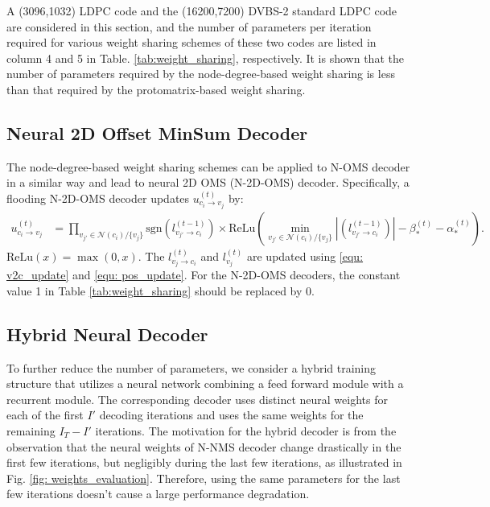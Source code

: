 \documentclass [PhD] {uclathes}
\begin{document}
A (3096,1032) LDPC code and the (16200,7200) DVBS-2\cite{noauthor_2019-nv} standard LDPC code are considered in this section, and the number of parameters per iteration required for various weight sharing schemes of these two codes are listed in column 4 and 5 in Table. \ref{tab:weight_sharing}, respectively. It is shown that the number of parameters required by the node-degree-based weight sharing is less than that required by the protomatrix-based weight sharing.

\subsection{Neural 2D Offset MinSum Decoder}
The node-degree-based weight sharing schemes can be applied to N-OMS decoder in a similar way and lead to neural 2D OMS (N-2D-OMS) decoder. Specifically, a flooding N-2D-OMS decoder updates  $u^{(t)}_{c_i\rightarrow v_j}$ by: 
\begin{align}
     u^{(t)}_{c_i\rightarrow v_j} &= \prod_{v_{j'}\in \mathcal{N}(c_i)/\{v_j\}} \text{sgn}\left(l^{(t-1)}_{v_{j'}\rightarrow c_{i}}\right)  \times   \text{ReLu} \left(\min_{v_{j'}\in \mathcal{N}(c_i)/\{v_j\}} \left|(l^{(t-1)}_{v_{j'}\rightarrow c_{i}})\right|-\beta^{(t)}_*-\alpha ^{(t)}_*\right).
\end{align}
${\mathrm{ReLu}}(x)=\max(0,x)$. The $l_{v_j\rightarrow c_i}^{(t)}$ and $l_{v_j}^{(t)}$ are updated using \eqref{equ: v2c_update} and \eqref{equ: pos_update}. For the N-2D-OMS decoders, the constant value 1 in Table \ref{tab:weight_sharing} should be replaced by 0. 

\subsection{Hybrid Neural Decoder}
To further reduce the number of parameters, we consider a hybrid training structure that utilizes a neural network combining a feed forward module with a recurrent module. The corresponding decoder uses distinct neural weights for each of the first $I'$ decoding iterations and uses the same weights 
for the remaining  $I_T-I'$ iterations.
The motivation for the hybrid decoder is from the observation that the neural weights of N-NMS decoder change drastically in the first few iterations, but negligibly during the last few iterations, as illustrated in Fig. \ref{fig: weights_evaluation}. Therefore, using the same parameters for the last few iterations doesn't cause a large performance degradation. 
\end{document}
